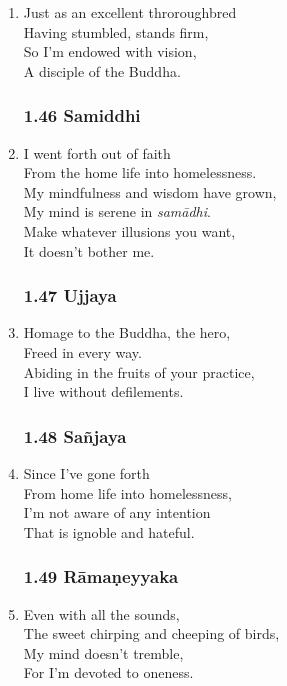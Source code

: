\documentclass[10pt, openany]{book}
\begin{document}
\begin{enumerate}
\item Just as an excellent throroughbred\\
Having stumbled, stands firm,\\
So I’m endowed with vision,\\
A disciple of the Buddha.

\subsubsection*{1.46 Samiddhi}

\item I went forth out of faith\\
From the home life into homelessness.\\
My mindfulness and wisdom have grown,\\
My mind is serene in \emph{samādhi}.\\
Make whatever illusions you want,\\
It doesn’t bother me.

\subsubsection*{1.47 Ujjaya}

\item Homage to the Buddha, the hero,\\
Freed in every way.\\
Abiding in the fruits of your practice,\\
I live without defilements.

\subsubsection*{1.48 Sañjaya}

\item Since I’ve gone forth\\
From home life into homelessness,\\
I’m not aware of any intention\\
That is ignoble and hateful.

\subsubsection*{1.49 Rāmaṇeyyaka}

\item Even with all the sounds,\\
The sweet chirping and cheeping of birds,\\
My mind doesn’t tremble,\\
For I’m devoted to oneness.


\end{enumerate}
\end{document}
